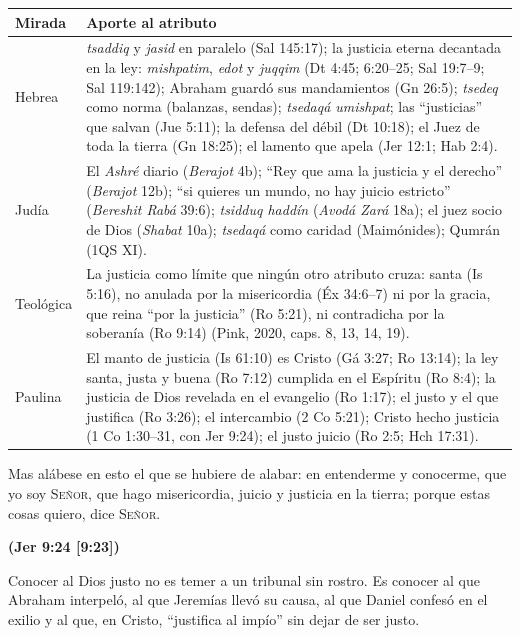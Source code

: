 \documentclass[11pt,letterpaper]{article}
\newcommand{\SENOR}{\textsc{Señor}}
\newcommand{\fuente}[1]{\par\hfill{\upshape\bfseries\small\textcolor{azul}{#1}}}
\begin{document}
\begin{center}\small\renewcommand{\arraystretch}{1.18}
\begin{tabular}{@{}L{2.4cm}L{11.4cm}@{}}
\toprule
\textbf{Mirada} & \textbf{Aporte al atributo} \\ \midrule
Hebrea & \emph{tsaddiq} y \emph{jasid} en paralelo (Sal 145:17); la justicia eterna decantada en la ley: \emph{mishpatim}, \emph{edot} y \emph{juqqim} (Dt 4:45; 6:20--25; Sal 19:7--9; Sal 119:142); Abraham guardó sus mandamientos (Gn 26:5); \emph{tsedeq} como norma (balanzas, sendas); \emph{tsedaqá umishpat}; las ``justicias'' que salvan (Jue 5:11); la defensa del débil (Dt 10:18); el Juez de toda la tierra (Gn 18:25); el lamento que apela (Jer 12:1; Hab 2:4). \\
Judía & El \emph{Ashré} diario (\emph{Berajot} 4b); ``Rey que ama la justicia y el derecho'' (\emph{Berajot} 12b); ``si quieres un mundo, no hay juicio estricto'' (\emph{Bereshit Rabá} 39:6); \emph{tsidduq haddín} (\emph{Avodá Zará} 18a); el juez socio de Dios (\emph{Shabat} 10a); \emph{tsedaqá} como caridad (Maimónides); Qumrán (1QS XI). \\
Teológica & La justicia como límite que ningún otro atributo cruza: santa (Is 5:16), no anulada por la misericordia (Éx 34:6--7) ni por la gracia, que reina ``por la justicia'' (Ro 5:21), ni contradicha por la soberanía (Ro 9:14) (Pink, 2020, caps. 8, 13, 14, 19). \\
Paulina & El manto de justicia (Is 61:10) es Cristo (Gá 3:27; Ro 13:14); la ley santa, justa y buena (Ro 7:12) cumplida en el Espíritu (Ro 8:4); la justicia de Dios revelada en el evangelio (Ro 1:17); el justo y el que justifica (Ro 3:26); el intercambio (2 Co 5:21); Cristo hecho justicia (1 Co 1:30--31, con Jer 9:24); el justo juicio (Ro 2:5; Hch 17:31). \\
\bottomrule
\end{tabular}\end{center}

\begin{cita}Mas alábese en esto el que se hubiere de alabar: en entenderme y conocerme, que yo soy \SENOR, que hago misericordia, juicio y justicia en la tierra; porque estas cosas quiero, dice \SENOR.\fuente{(Jer 9:24 [9:23])}\end{cita}

Conocer al Dios justo no es temer a un tribunal sin rostro. Es conocer al que Abraham interpeló, al que Jeremías llevó su causa, al que Daniel confesó en el exilio y al que, en Cristo, ``justifica al impío'' sin dejar de ser justo.
\end{document}
